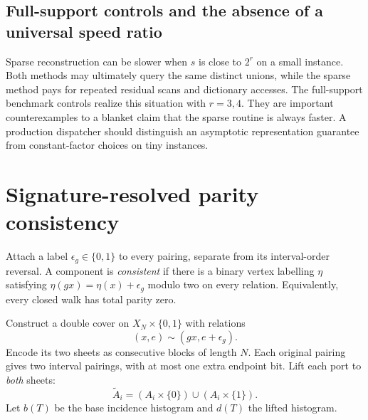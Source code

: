 \documentclass[11pt,letterpaper]{article}
\theoremstyle{definition}
\begin{document}
\subsection{Full-support controls and the absence of a universal speed ratio}
Sparse reconstruction can be slower when $s$ is close to $2^r$ on a small
instance. Both methods may ultimately query the same distinct unions, while
the sparse method pays for repeated residual scans and dictionary accesses.
The full-support benchmark controls realize this situation with $r=3,4$.
They are important counterexamples to a blanket claim that the sparse
routine is always faster. A production dispatcher should distinguish an
asymptotic representation guarantee from constant-factor choices on tiny
instances.

\section{Signature-resolved parity consistency}\label{sec:signed}

Attach a label $\epsilon_g\in\{0,1\}$ to every pairing, separate from its
interval-order reversal. A component is \emph{consistent} if there is a
binary vertex labelling $\eta$ satisfying
$\eta(gx)=\eta(x)+\epsilon_g$ modulo two on every relation. Equivalently,
every closed walk has total parity zero.

Construct a double cover on $X_N\times\{0,1\}$ with relations
\[
 (x,e)\sim(gx,e+\epsilon_g).
\]
Encode its two sheets as consecutive blocks of length $N$. Each original
pairing gives two interval pairings, with at most one extra endpoint bit.
Lift each port to \emph{both} sheets:
\[
 \widetilde A_i=(A_i\times\{0\})\cup(A_i\times\{1\}).
\]
Let $b(T)$ be the base incidence histogram and $d(T)$ the lifted histogram.
\end{document}
